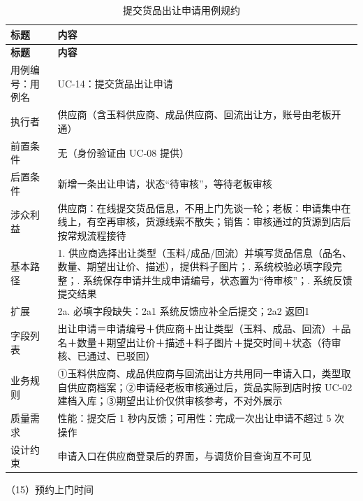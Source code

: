 {\small
\begin{longtable}{@{}L{3.0cm} L{12.3cm}@{}}
\caption{提交货品出让申请用例规约}\label{tab:uc-14}\\
\toprule
\textbf{标题} & \textbf{内容} \\
\midrule
\endfirsthead
\toprule
\textbf{标题} & \textbf{内容} \\
\midrule
\endhead
用例编号：用例名 & UC-14：提交货品出让申请 \\
\midrule
执行者 & 供应商（含玉料供应商、成品供应商、回流出让方，账号由老板开通） \\
\midrule
前置条件 & 无（身份验证由 UC-08 提供） \\
\midrule
后置条件 & 新增一条出让申请，状态“待审核”，等待老板审核 \\
\midrule
涉众利益 & 供应商：在线提交货品信息，不用上门先谈一轮；\newline 老板：申请集中在线上，有空再审核，货源线索不散失；\newline 销售：审核通过的货源到店后按常规流程接待 \\
\midrule
基本路径 & 1. 供应商选择出让类型（玉料/成品/回流）并填写货品信息（品名、数量、期望出让价、描述），提供料子图片；. 系统校验必填字段完整；. 系统保存申请并生成申请编号，状态置为“待审核”；. 系统反馈提交结果 \\
\midrule
扩展 & 2a. 必填字段缺失：2a1 系统反馈应补全后提交；2a2 返回1 \\
\midrule
字段列表 & 出让申请＝申请编号＋供应商＋出让类型（玉料、成品、回流）＋品名＋数量＋期望出让价＋描述＋料子图片＋提交时间＋状态（待审核、已通过、已驳回） \\
\midrule
业务规则 & ①玉料供应商、成品供应商与回流出让方共用同一申请入口，类型取自供应商档案；\newline ②申请经老板审核通过后，货品实际到店时按 UC-02 建档入库；\newline ③期望出让价仅供审核参考，不对外展示 \\
\midrule
质量需求 & 性能：提交后 1 秒内反馈；\newline 可用性：完成一次出让申请不超过 5 次操作 \\
\midrule
设计约束 & 申请入口在供应商登录后的界面，与调货价目查询互不可见 \\
\midrule
\bottomrule
\end{longtable}}
\noindent（15）预约上门时间

